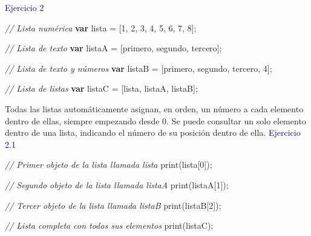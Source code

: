 \documentclass[
  12pt,
  letterpaper,
  twoside]{book}
\newenvironment{Shaded}{\begin{snugshade}}{\end{snugshade}}
\newcommand{\CommentTok}[1]{\textcolor[rgb]{0.24,0.58,0.00}{\textit{#1}}}
\newcommand{\ControlFlowTok}[1]{\textcolor[rgb]{0.00,0.00,0.00}{\textbf{#1}}}
\newcommand{\DecValTok}[1]{\textcolor[rgb]{0.28,0.53,0.93}{#1}}
\newcommand{\FunctionTok}[1]{\textcolor[rgb]{0.48,0.12,0.64}{#1}}
\newcommand{\NormalTok}[1]{#1}
\newcommand{\OperatorTok}[1]{\textcolor[rgb]{0.00,0.00,0.00}{#1}}
\newcommand{\StringTok}[1]{\textcolor[rgb]{0.87,0.29,0.22}{#1}}
\begin{document}
\textcolor{darkblue}{Ejercicio 2}

\begin{Shaded}
\begin{Highlighting}[]
\CommentTok{// Lista numérica}
\ControlFlowTok{var}\NormalTok{ lista }\OperatorTok{=}\NormalTok{ [}\DecValTok{1}\OperatorTok{,} \DecValTok{2}\OperatorTok{,} \DecValTok{3}\OperatorTok{,} \DecValTok{4}\OperatorTok{,} \DecValTok{5}\OperatorTok{,} \DecValTok{6}\OperatorTok{,} \DecValTok{7}\OperatorTok{,} \DecValTok{8}\NormalTok{]}\OperatorTok{;}   
  
\CommentTok{// Lista de texto            }
\ControlFlowTok{var}\NormalTok{ listaA }\OperatorTok{=}\NormalTok{ [}\StringTok{\textquotesingle{}primero\textquotesingle{}}\OperatorTok{,} \StringTok{\textquotesingle{}segundo\textquotesingle{}}\OperatorTok{,} \StringTok{\textquotesingle{}tercero\textquotesingle{}}\NormalTok{]}\OperatorTok{;} 
   
\CommentTok{// Lista de texto y números  }
\ControlFlowTok{var}\NormalTok{ listaB }\OperatorTok{=}\NormalTok{ [}\StringTok{\textquotesingle{}primero\textquotesingle{}}\OperatorTok{,} \StringTok{\textquotesingle{}segundo\textquotesingle{}}\OperatorTok{,} \StringTok{\textquotesingle{}tercero\textquotesingle{}}\OperatorTok{,} \DecValTok{4}\NormalTok{]}\OperatorTok{;} 

\CommentTok{// Lista de listas  }
\ControlFlowTok{var}\NormalTok{ listaC }\OperatorTok{=}\NormalTok{ [lista}\OperatorTok{,}\NormalTok{ listaA}\OperatorTok{,}\NormalTok{ listaB]}\OperatorTok{;} 
\end{Highlighting}
\end{Shaded}

Todas las listas automáticamente asignan, en orden, un número a cada elemento dentro de ellas, siempre empezando desde 0. Se puede consultar un solo elemento dentro de una lista, indicando el número de su posición dentro de ella.
\newpage
\textcolor{darkblue}{Ejercicio 2.1}

\begin{Shaded}
\begin{Highlighting}[]
\CommentTok{// Primer objeto de la lista llamada \textquotesingle{}lista\textquotesingle{}}
\FunctionTok{print}\NormalTok{(lista[}\DecValTok{0}\NormalTok{])}\OperatorTok{;} 

\CommentTok{// Segundo objeto de la lista llamada \textquotesingle{}listaA\textquotesingle{}}
\FunctionTok{print}\NormalTok{(listaA[}\DecValTok{1}\NormalTok{])}\OperatorTok{;}

\CommentTok{// Tercer objeto de la lista llamada \textquotesingle{}listaB\textquotesingle{}}
\FunctionTok{print}\NormalTok{(listaB[}\DecValTok{2}\NormalTok{])}\OperatorTok{;}

\CommentTok{// Lista completa con todos sus elementos}
\FunctionTok{print}\NormalTok{(listaC)}\OperatorTok{;}    
\end{Highlighting}
\end{Shaded}
\end{document}
